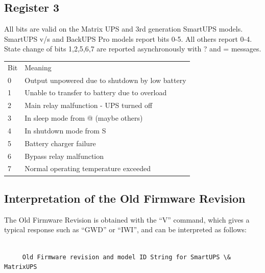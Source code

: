 {{{{{{{{{{{{{{{{{\begin{longtable}{p{0.3in}p{4.7in}}
\end{longtable}

\label{Register-3}

\subsection*{Register 3}

All bits are valid on the Matrix UPS and 3rd generation SmartUPS models.
SmartUPS v/s and BackUPS Pro models report bits 0-5. All others report 0-4.
State change of bits 1,2,5,6,7 are reported asynchronously with ? and =
messages.  

\begin{longtable}{p{0.3in}p{4.7in}}
{Bit} & {Meaning 
 } \\
{0} & {Output unpowered due to shutdown by low battery 
 } \\
{1} & {Unable to transfer to battery due to overload 
 } \\
{2} & {Main relay malfunction - UPS turned off 
 } \\
{3} & {In sleep mode from @ (maybe others) 
 } \\
{4} & {In shutdown mode from S 
 } \\
{5} & {Battery charger failure 
 } \\
{6} & {Bypass relay malfunction 
 } \\
{7} & {Normal operating temperature exceeded  
}

\end{longtable}

\label{Interpretation-of-the-Old-Firmware-Revision}

\subsection*{Interpretation of the Old Firmware Revision}

The Old Firmware Revision is obtained with the ``V'' command, which gives a
typical response such as ``GWD'' or ``IWI'', and can be interpreted as
follows: 

\footnotesize
\begin{verbatim}
     
     Old Firmware revision and model ID String for SmartUPS \& MatrixUPS
     

\end{verbatim}}}}}}}}}}}}}}}}}}
